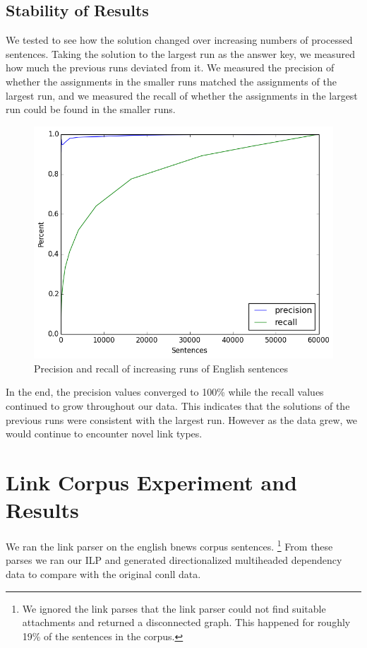 \documentclass[11pt]{article}
\begin{document}
\subsection{Stability of Results}
We tested to see how the solution changed over increasing numbers of processed sentences. 
Taking the solution to the largest run as the answer key, we measured how much the previous runs deviated from it. We measured the precision of whether the assignments in the smaller runs matched the assignments of the largest run, and we measured the recall of whether the assignments in the largest run could be found in the smaller runs. 

\begin{figure}[ht!]
  \small
  \includegraphics[width=\linewidth, keepaspectratio=true]{figure/precision_recall.png}
  \caption{\small Precision and recall of increasing runs of English sentences}
\end{figure}

In the end, the precision values converged to 100\% while the recall values continued to grow throughout our data. This indicates that the solutions of the previous runs were consistent with the largest run. However as the data grew, we would continue to encounter novel link types.







\section{Link Corpus Experiment and Results}
We ran the link parser on the english bnews corpus sentences. \footnote{We ignored the link parses that the link parser could not find suitable attachments and returned a disconnected graph. This happened for roughly 19\% of the sentences in the corpus.} 
From these parses we ran our ILP and generated directionalized multiheaded dependency data to compare with the original conll data.
\end{document}
